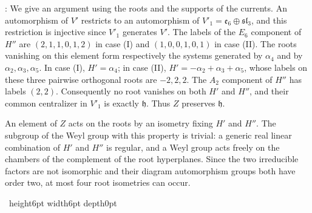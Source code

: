 \documentclass[leqno]{article}
\newcommand{\qed}{\hfill \vrule height6pt  width6pt depth0pt}
\newenvironment{proof}[1][]{\noindent {\it Proof #1} : }{\hbox{~}\qed
\smallskip
}
\numberwithin{equation}{section}
\begin{document}
\begin{proof}
We give an argument using the roots and the supports of the currents. An automorphism of $V'$ restricts to an automorphism of $V'_1 = \mathfrak e_6 \oplus \mathfrak{sl}_3$, and this restriction is injective since $V'_1$ generates $V'$. The labels of the $E_6$ component of $H''$ are $(2,1,1,0,1,2)$ in case (I) and $(1,0,0,1,0,1)$ in case (II). The roots vanishing on this element form respectively the systems generated by $\alpha_4$ and by $\alpha_2,\alpha_3,\alpha_5$. In case (I), $H' = \alpha_4$; in case (II), $H' = -\alpha_2+\alpha_3+\alpha_5$, whose labels on these three pairwise orthogonal roots are $-2,2,2$. The $A_2$ component of $H''$ has labels $(2,2)$. Consequently no root vanishes on both $H'$ and $H''$, and their common centralizer in $V'_1$ is exactly $\mathfrak h$. Thus $Z$ preserves $\mathfrak h$.

An element of $Z$ acts on the roots by an isometry fixing $H'$ and $H''$. The subgroup of the Weyl group with this property is trivial: a generic real linear combination of $H'$ and $H''$ is regular, and a Weyl group acts freely on the chambers of the complement of the root hyperplanes. Since the two irreducible factors are not isomorphic and their diagram automorphism groups both have order two, at most four root isometries can occur.


\end{proof}
\end{document}

